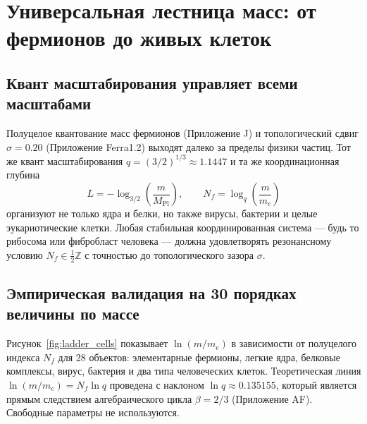\documentclass[11pt,a4paper]{article}
\begin{document}
	\section{Универсальная лестница масс: от фермионов до живых клеток}
	\label{sec:ladder_cells}
	
	\subsection{Квант масштабирования управляет всеми масштабами}
	
	Полуцелое квантование масс фермионов (Приложение J) и топологический сдвиг \(\sigma = 0.20\) (Приложение Ferra1.2) выходят далеко за пределы физики частиц. Тот же квант масштабирования \(q = (3/2)^{1/3} \approx 1.1447\) и та же координационная глубина
	\[
	L = -\log_{3/2}\left(\frac{m}{M_{\mathrm{Pl}}}\right), \qquad
	N_f = \log_q\left(\frac{m}{m_e}\right)
	\]
	организуют не только ядра и белки, но также вирусы, бактерии и целые эукариотические клетки. Любая стабильная координированная система — будь то рибосома или фибробласт человека — должна удовлетворять резонансному условию \(N_f \in \frac{1}{2}\mathbb{Z}\) с точностью до топологического зазора \(\sigma\).
	
	\subsection{Эмпирическая валидация на 30 порядках величины по массе}
	
	Рисунок~\ref{fig:ladder_cells} показывает \(\ln(m/m_e)\) в зависимости от полуцелого индекса \(N_f\) для 28 объектов: элементарные фермионы, легкие ядра, белковые комплексы, вирус, бактерия и два типа человеческих клеток. Теоретическая линия \(\ln(m/m_e) = N_f \ln q\) проведена с наклоном \(\ln q \approx 0.135155\), который является прямым следствием алгебраического цикла \(\beta = 2/3\) (Приложение AF). Свободные параметры не используются.
	
\end{document}
